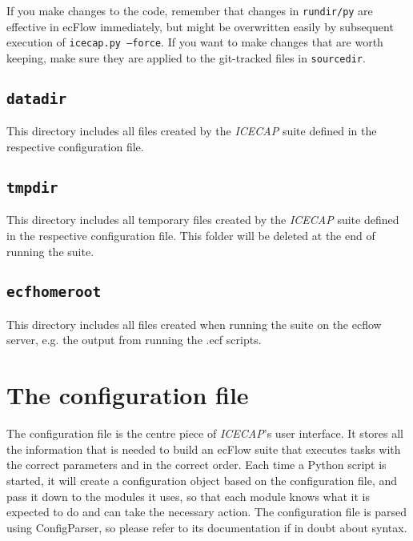 \documentclass[DIV=10, parskip=full]{scrreprt}
\newcommand{\ice}{\textit{ICECAP}\xspace}
\begin{document}

If you make changes to the code, remember that changes in \texttt{rundir/py} are effective in ecFlow immediately, but might be overwritten easily by subsequent execution of \texttt{icecap.py --force}. If you want to make changes that are worth keeping, make sure they are applied to the git-tracked files in \texttt{sourcedir}.

\section{\texttt{datadir}}
This directory includes all files created by the \ice suite defined in the respective configuration file.

\section{\texttt{tmpdir}}
This directory includes all temporary files created by the \ice suite defined in the respective configuration file. This folder will be deleted at the end of running the suite.

\section{\texttt{ecfhomeroot}}
This directory includes all files created when running the suite on the ecflow server, e.g. the output from running the .ecf scripts.





\chapter{The configuration file}\label{chap:config}
The configuration file is the centre piece of {\ice}'s user interface. It stores  all the information that is needed to build an ecFlow suite that executes tasks with the correct parameters and in the correct order. Each time a Python script is started, it will create a configuration object based on the configuration file, and pass it down to the modules it uses, so that each module knows what it is expected to do and can take the necessary action. The configuration file is parsed using ConfigParser, so please refer to its documentation if in doubt about syntax. 
\end{document}
